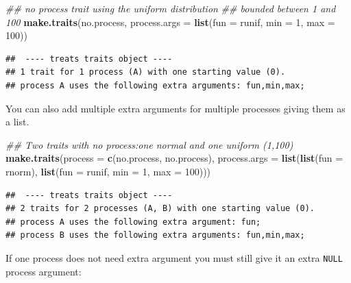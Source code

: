 \documentclass[
]{book}
\newenvironment{Shaded}{\begin{snugshade}}{\end{snugshade}}
\newcommand{\CommentTok}[1]{\textcolor[rgb]{0.56,0.35,0.01}{\textit{#1}}}
\newcommand{\DataTypeTok}[1]{\textcolor[rgb]{0.13,0.29,0.53}{#1}}
\newcommand{\DecValTok}[1]{\textcolor[rgb]{0.00,0.00,0.81}{#1}}
\newcommand{\KeywordTok}[1]{\textcolor[rgb]{0.13,0.29,0.53}{\textbf{#1}}}
\newcommand{\NormalTok}[1]{#1}
\begin{document}
\begin{Shaded}
\begin{Highlighting}[]
\CommentTok{\#\# no process trait using the uniform distribution}
\CommentTok{\#\# bounded between 1 and 100}
\KeywordTok{make.traits}\NormalTok{(no.process, }\DataTypeTok{process.args =} \KeywordTok{list}\NormalTok{(}\DataTypeTok{fun =}\NormalTok{ runif, }\DataTypeTok{min =} \DecValTok{1}\NormalTok{, }\DataTypeTok{max =} \DecValTok{100}\NormalTok{))}
\end{Highlighting}
\end{Shaded}

\begin{verbatim}
##  ---- treats traits object ---- 
## 1 trait for 1 process (A) with one starting value (0).
## process A uses the following extra arguments: fun,min,max;
\end{verbatim}

You can also add multiple extra arguments for multiple processes giving them as a list.

\begin{Shaded}
\begin{Highlighting}[]
\CommentTok{\#\# Two traits with no process:one normal and one uniform (1,100)}
\KeywordTok{make.traits}\NormalTok{(}\DataTypeTok{process =} \KeywordTok{c}\NormalTok{(no.process, no.process),}
            \DataTypeTok{process.args =} \KeywordTok{list}\NormalTok{(}\KeywordTok{list}\NormalTok{(}\DataTypeTok{fun =}\NormalTok{ rnorm),}
                                \KeywordTok{list}\NormalTok{(}\DataTypeTok{fun =}\NormalTok{ runif, }\DataTypeTok{min =} \DecValTok{1}\NormalTok{, }\DataTypeTok{max =} \DecValTok{100}\NormalTok{)))}
\end{Highlighting}
\end{Shaded}

\begin{verbatim}
##  ---- treats traits object ---- 
## 2 traits for 2 processes (A, B) with one starting value (0).
## process A uses the following extra argument: fun;
## process B uses the following extra arguments: fun,min,max;
\end{verbatim}

If one process does not need extra argument you must still give it an extra \texttt{NULL} process argument:
\end{document}
